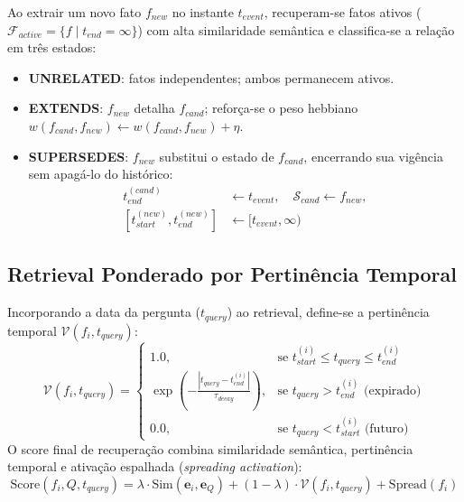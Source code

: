 \documentclass[10pt,conference,twocolumn]{IEEEtran}
\begin{document}
Ao extrair um novo fato $f_{new}$ no instante $t_{event}$, recuperam-se fatos ativos ($\mathcal{F}_{active} = \{f \mid t_{end} = \infty\}$) com alta similaridade semântica e classifica-se a relação em três estados:
\begin{itemize}
    \item \textbf{UNRELATED}: fatos independentes; ambos permanecem ativos.
    \item \textbf{EXTENDS}: $f_{new}$ detalha $f_{cand}$; reforça-se o peso hebbiano $w(f_{cand}, f_{new}) \leftarrow w(f_{cand}, f_{new}) + \eta$.
    \item \textbf{SUPERSEDES}: $f_{new}$ substitui o estado de $f_{cand}$, encerrando sua vigência sem apagá-lo do histórico:
    \begin{align}
    t_{end}^{(cand)} &\leftarrow t_{event}, \quad \mathcal{S}_{cand} \leftarrow f_{new}, \nonumber \\
    [t_{start}^{(new)}, t_{end}^{(new)}] &\leftarrow [t_{event}, \infty)
    \end{align}
\end{itemize}

\subsection{Retrieval Ponderado por Pertinência Temporal}
Incorporando a data da pergunta ($t_{query}$) ao retrieval, define-se a pertinência temporal $\mathcal{V}(f_i, t_{query})$:
\begin{equation}
\mathcal{V}(f_i, t_{query}) = 
\begin{cases}
1.0, & \text{se } t_{start}^{(i)} \le t_{query} \le t_{end}^{(i)} \\
\exp\left(-\frac{|t_{query} - t_{end}^{(i)}|}{\tau_{decay}}\right), & \text{se } t_{query} > t_{end}^{(i)} \text{ (expirado)} \\
0.0, & \text{se } t_{query} < t_{start}^{(i)} \text{ (futuro)}
\end{cases}
\end{equation}
O score final de recuperação combina similaridade semântica, pertinência temporal e ativação espalhada (\textit{spreading activation}):
\begin{equation}
\text{Score}(f_i, Q, t_{query}) = \lambda \cdot \text{Sim}(\mathbf{e}_i, \mathbf{e}_Q) + (1-\lambda) \cdot \mathcal{V}(f_i, t_{query}) + \text{Spread}(f_i)
\end{equation}

\end{document}
